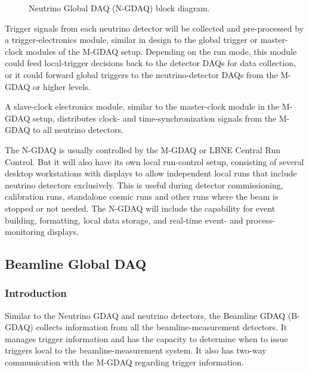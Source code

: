 \begin{figure}[htp]
\begin{center}
\caption{\label{fig:GDAQ_N_Block} Neutrino Global DAQ (N-GDAQ) block 
diagram.  %
}
\end{center}
\end{figure}


Trigger signals from each neutrino detector will be collected and 
pre-processed by a trigger-electronics module, similar in design to the 
global trigger or master-clock modules %
of the M-GDAQ setup. Depending on the run mode, this module could feed 
local-trigger decisions back to the detector DAQs for data collection, or 
it could
forward global triggers to the neutrino-detector DAQs from the M-GDAQ or 
higher levels.

A slave-clock electronics module, similar to the master-clock module in 
the M-GDAQ setup, distributes clock- and time-synchronization signals 
from the M-GDAQ to all neutrino detectors.

The N-GDAQ is usually controlled by the %
M-GDAQ  %
or LBNE Central Run 
Control.  But it will also have its own local run-control setup, 
consisting of several desktop workstations with displays to allow 
independent local runs 
that include %
neutrino  detectors exclusively. This is useful during detector commissioning, calibration 
runs, standalone cosmic runs and other runs where the beam is stopped or 
not needed. %
The N-GDAQ will include the capability for event building, 
formatting, local data storage, and real-time event- and process-monitoring displays.


\subsection{Beamline Global DAQ}
\label{subsec:B-GDAQ}

\subsubsection{Introduction} %
Similar to the Neutrino GDAQ and neutrino detectors, the Beamline GDAQ (B-GDAQ) collects 
information from all %
the beamline-measurement detectors.
 It manages trigger information and has the capacity 
to determine when to issue triggers local to the beamline-measurement system. It 
also has two-way communication with the %
M-GDAQ %
regarding trigger 
information.

